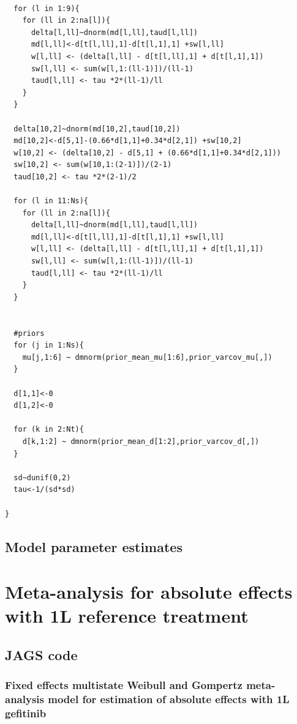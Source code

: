 \documentclass[11pt,final,fleqn]{article}\usepackage[]{graphicx}\usepackage[]{color}
\theoremstyle{plain}
\begin{document}
\begin{appendices}
\begin{verbatim}
  
  for (l in 1:9){
    for (ll in 2:na[l]){
      delta[l,ll]~dnorm(md[l,ll],taud[l,ll])
      md[l,ll]<-d[t[l,ll],1]-d[t[l,1],1] +sw[l,ll]
      w[l,ll] <- (delta[l,ll] - d[t[l,ll],1] + d[t[l,1],1])
      sw[l,ll] <- sum(w[l,1:(ll-1)])/(ll-1) 
      taud[l,ll] <- tau *2*(ll-1)/ll 
    }
  }
  
  delta[10,2]~dnorm(md[10,2],taud[10,2])
  md[10,2]<-d[5,1]-(0.66*d[1,1]+0.34*d[2,1]) +sw[10,2]
  w[10,2] <- (delta[10,2] - d[5,1] + (0.66*d[1,1]+0.34*d[2,1]))
  sw[10,2] <- sum(w[10,1:(2-1)])/(2-1) 
  taud[10,2] <- tau *2*(2-1)/2 
  
  for (l in 11:Ns){
    for (ll in 2:na[l]){
      delta[l,ll]~dnorm(md[l,ll],taud[l,ll])
      md[l,ll]<-d[t[l,ll],1]-d[t[l,1],1] +sw[l,ll]
      w[l,ll] <- (delta[l,ll] - d[t[l,ll],1] + d[t[l,1],1])
      sw[l,ll] <- sum(w[l,1:(ll-1)])/(ll-1) 
      taud[l,ll] <- tau *2*(ll-1)/ll 
    }
  }
  
  
  #priors
  for (j in 1:Ns){
    mu[j,1:6] ~ dmnorm(prior_mean_mu[1:6],prior_varcov_mu[,]) 
  }
  
  d[1,1]<-0
  d[1,2]<-0

  for (k in 2:Nt){
    d[k,1:2] ~ dmnorm(prior_mean_d[1:2],prior_varcov_d[,]) 
  }
  
  sd~dunif(0,2)
  tau<-1/(sd*sd)
  
}

\end{verbatim}


\subsection{Model parameter estimates}

\section{Meta-analysis for absolute effects with 1L reference treatment}
\subsection{JAGS code}

\subsubsection{Fixed effects multistate Weibull and Gompertz meta-analysis model for estimation of absolute effects with 1L gefitinib } 

\begin{verbatim} 


\end{verbatim}
\end{appendices}
\end{document}
